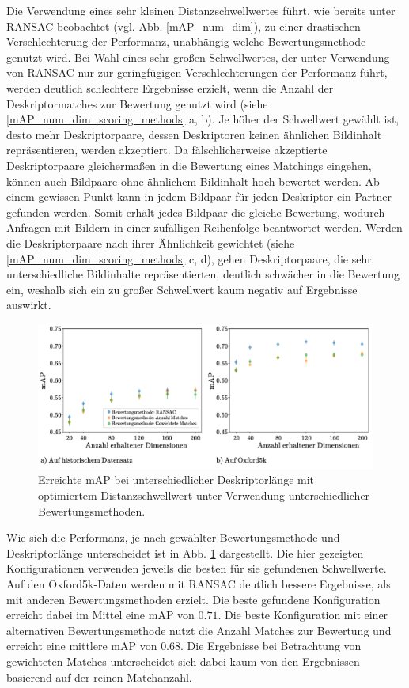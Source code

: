 Die Verwendung eines sehr kleinen Distanzschwellwertes führt, wie bereits unter RANSAC beobachtet (vgl. Abb. \ref{mAP_num_dim}), zu einer drastischen Verschlechterung der Performanz, unabhängig welche Bewertungsmethode genutzt wird. Bei Wahl eines sehr großen Schwellwertes, der unter Verwendung von RANSAC nur zur geringfügigen Verschlechterungen der Performanz führt, werden deutlich schlechtere Ergebnisse erzielt, wenn die Anzahl der Deskriptormatches zur Bewertung genutzt wird (siehe \ref{mAP_num_dim_scoring_methods} a, b). Je höher der Schwellwert gewählt ist, desto mehr Deskriptorpaare, dessen Deskriptoren keinen ähnlichen Bildinhalt repräsentieren, werden akzeptiert. Da fälschlicherweise akzeptierte Deskriptorpaare gleichermaßen in die Bewertung eines Matchings eingehen, können auch Bildpaare ohne ähnlichem Bildinhalt hoch bewertet werden. Ab einem gewissen Punkt kann in jedem Bildpaar für jeden Deskriptor ein Partner gefunden werden. Somit erhält jedes Bildpaar die gleiche Bewertung, wodurch Anfragen mit Bildern in einer zufälligen Reihenfolge beantwortet werden. Werden die Deskriptorpaare nach ihrer Ähnlichkeit gewichtet (siehe \ref{mAP_num_dim_scoring_methods} c, d), gehen Deskriptorpaare, die sehr unterschiedliche Bildinhalte repräsentierten, deutlich schwächer in die Bewertung ein, weshalb sich ein zu großer Schwellwert kaum negativ auf Ergebnisse auswirkt.
\\
\begin{figure}[h]
\includegraphics[scale=0.74]{compare_scoring_methods}
\caption{Erreichte mAP bei unterschiedlicher Deskriptorlänge mit optimiertem Distanzschwellwert unter Verwendung unterschiedlicher Bewertungsmethoden.}
\label{compare_scoring_methods}
\end{figure}
Wie sich die Performanz, je nach gewählter Bewertungsmethode und Deskriptorlänge unterscheidet ist in Abb. \ref{compare_scoring_methods} dargestellt. Die hier gezeigten Konfigurationen verwenden jeweils die besten für sie gefundenen Schwellwerte. Auf den Oxford5k-Daten werden mit RANSAC deutlich bessere Ergebnisse, als mit anderen Bewertungsmethoden erzielt. Die beste gefundene Konfiguration erreicht dabei im Mittel eine mAP von $0.71$. Die beste Konfiguration mit einer alternativen Bewertungsmethode nutzt die Anzahl Matches zur Bewertung und erreicht eine mittlere mAP von $0.68$. Die Ergebnisse bei Betrachtung von gewichteten Matches unterscheidet sich dabei kaum von den Ergebnissen basierend auf der reinen Matchanzahl.
